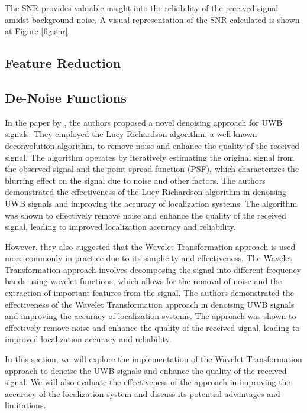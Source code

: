 \documentclass[
	article, %
	11pt, %
	draft, %
]{CSUniSchoolLabReport}
\begin{document}
The SNR provides valuable insight into the reliability of the received signal amidst background noise. A visual representation of the SNR calculated is shown at Figure \ref{fig:snr}

\subsection{Feature Reduction}\label{feature_reduction}

\subsection{De-Noise Functions}\label{de_noise_Functions}

In the paper by \cite{jiang_uwb_2020}, the authors proposed a novel denoising approach for UWB signals. They employed the Lucy-Richardson algorithm, a well-known deconvolution algorithm, to remove noise and enhance the quality of the received signal. The algorithm operates by iteratively estimating the original signal from the observed signal and the point spread function (PSF), which characterizes the blurring effect on the signal due to noise and other factors. The authors demonstrated the effectiveness of the Lucy-Richardson algorithm in denoising UWB signals and improving the accuracy of localization systems. The algorithm was shown to effectively remove noise and enhance the quality of the received signal, leading to improved localization accuracy and reliability.

However, they also suggested that the Wavelet Transformation approach is used more commonly in practice due to its simplicity and effectiveness. The Wavelet Transformation approach involves decomposing the signal into different frequency bands using wavelet functions, which allows for the removal of noise and the extraction of important features from the signal. The authors demonstrated the effectiveness of the Wavelet Transformation approach in denoising UWB signals and improving the accuracy of localization systems. The approach was shown to effectively remove noise and enhance the quality of the received signal, leading to improved localization accuracy and reliability.

In this section, we will explore the implementation of the Wavelet Transformation approach to denoise the UWB signals and enhance the quality of the received signal. We will also evaluate the effectiveness of the approach in improving the accuracy of the localization system and discuss its potential advantages and limitations.
\end{document}
